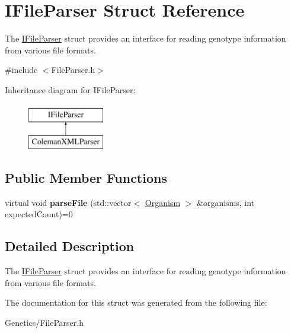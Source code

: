 \hypertarget{struct_i_file_parser}{}\section{I\+File\+Parser Struct Reference}
\label{struct_i_file_parser}


The \hyperlink{struct_i_file_parser}{I\+File\+Parser} struct provides an interface for reading genotype information from various file formats.  




{\ttfamily \#include $<$File\+Parser.\+h$>$}

Inheritance diagram for I\+File\+Parser\+:\begin{figure}[H]
\begin{center}
\leavevmode
\includegraphics[height=2.000000cm]{struct_i_file_parser}
\end{center}
\end{figure}
\subsection*{Public Member Functions}
\begin{DoxyCompactItemize}
\item 
virtual void {\bfseries parse\+File} (std\+::vector$<$ \hyperlink{class_organism}{Organism} $>$ \&organisms, int expected\+Count)=0\hypertarget{struct_i_file_parser_ace1ade2e3d05dfdeb1ea67796d271fdd}{}\label{struct_i_file_parser_ace1ade2e3d05dfdeb1ea67796d271fdd}

\end{DoxyCompactItemize}


\subsection{Detailed Description}
The \hyperlink{struct_i_file_parser}{I\+File\+Parser} struct provides an interface for reading genotype information from various file formats. 

The documentation for this struct was generated from the following file\+:\begin{DoxyCompactItemize}
\item 
Genetics/File\+Parser.\+h\end{DoxyCompactItemize}
